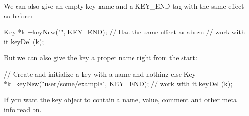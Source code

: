 We can also give an empty key name and a K\+E\+Y\+\_\+\+E\+ND tag with the same effect as before\+:


\begin{DoxyCodeInclude}
Key *k =\hyperlink{group__key_gad23c65b44bf48d773759e1f9a4d43b89}{keyNew}(\textcolor{stringliteral}{""}, \hyperlink{group__key_gga9b703ca49f48b482def322b77d3e6bc8aa8adb6fcb92dec58fb19410eacfdd403}{KEY\_END}); \textcolor{comment}{// Has the same effect as above}
\textcolor{comment}{// work with it}
\hyperlink{group__key_ga3df95bbc2494e3e6703ece5639be5bb1}{keyDel} (k);
\end{DoxyCodeInclude}
 But we can also give the key a proper name right from the start\+:


\begin{DoxyCodeInclude}
\textcolor{comment}{// Create and initialize a key with a name and nothing else}
Key *k=\hyperlink{group__key_gad23c65b44bf48d773759e1f9a4d43b89}{keyNew}(\textcolor{stringliteral}{"user/some/example"}, \hyperlink{group__key_gga9b703ca49f48b482def322b77d3e6bc8aa8adb6fcb92dec58fb19410eacfdd403}{KEY\_END});
\textcolor{comment}{// work with it}
\hyperlink{group__key_ga3df95bbc2494e3e6703ece5639be5bb1}{keyDel} (k);
\end{DoxyCodeInclude}
 If you want the key object to contain a name, value, comment and other meta info read on.


